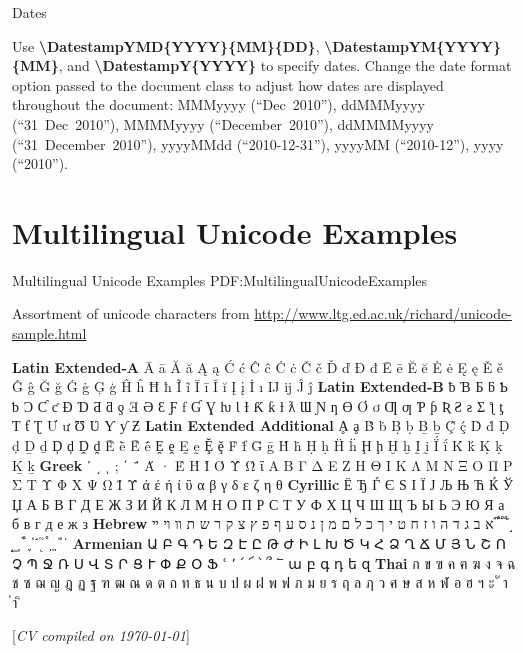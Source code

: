 \documentclass[letterpaper,MMMyyyy,nonstop]{simpleresumecv}
\newcommand{\CVNote}{CV compiled on {\today}}
\newcommand{\CodeCommand}[1]{\mbox{\textbf{\textbackslash{#1}}}}
\begin{document}
\begin{body}
\Gap
\BulletItem
Dates
\begin{detail}
\SubBulletItem
Use
\CodeCommand{DatestampYMD\{YYYY\}\{MM\}\{DD\}},
\CodeCommand{DatestampYM\{YYYY\}\{MM\}}, and
\CodeCommand{DatestampY\{YYYY\}}
to specify dates.
\SubBulletItem
Change the date format option passed to the document class to adjust how dates are displayed throughout the document:
MMMyyyy (``Dec~2010''),
ddMMMyyyy (``31~Dec~2010''),
MMMMyyyy (``December~2010''),
ddMMMMyyyy (``31~December~2010''),
yyyyMMdd (``2010-12-31''),
yyyyMM (``2010-12''),
yyyy (``2010'').
\end{detail}


\section
{Multilingual Unicode Examples}
{Multilingual Unicode Examples}
{PDF:MultilingualUnicodeExamples}

\BulletItem
Assortment of unicode characters from
\href{http://www.ltg.ed.ac.uk/~richard/unicode-sample.html}
{http://www.ltg.ed.ac.uk/{\TildeSymbol}richard/unicode-sample.html}

\begin{detail}
\SubItem
\textbf{Latin Extended-A}
Ā ā Ă ă Ą ą Ć ć Ĉ ĉ Ċ ċ Č č Ď ď Đ đ Ē ē Ĕ ĕ Ė ė Ę ę Ě ě Ĝ ĝ Ğ ğ Ġ ġ Ģ ģ Ĥ ĥ Ħ ħ Ĩ ĩ Ī ī Ĭ ĭ Į į İ ı Ĳ ĳ Ĵ ĵ
\textbf{Latin Extended-B}
ƀ Ɓ Ƃ ƃ Ƅ ƅ Ɔ Ƈ ƈ Ɖ Ɗ Ƌ ƌ ƍ Ǝ Ə Ɛ Ƒ ƒ Ɠ Ɣ ƕ Ɩ Ɨ Ƙ ƙ ƚ ƛ Ɯ Ɲ ƞ Ɵ Ơ ơ Ƣ ƣ Ƥ ƥ Ʀ Ƨ ƨ Ʃ ƪ ƫ Ƭ ƭ Ʈ Ư ư Ʊ Ʋ Ƴ ƴ Ƶ
\textbf{Latin Extended Additional}
Ḁ ḁ Ḃ ḃ Ḅ ḅ Ḇ ḇ Ḉ ḉ Ḋ ḋ Ḍ ḍ Ḏ ḏ Ḑ ḑ Ḓ ḓ Ḕ ḕ Ḗ ḗ Ḙ ḙ Ḛ ḛ Ḝ ḝ Ḟ ḟ Ḡ ḡ Ḣ ḣ Ḥ ḥ Ḧ ḧ Ḩ ḩ Ḫ ḫ Ḭ ḭ Ḯ ḯ Ḱ ḱ Ḳ ḳ Ḵ ḵ
\textbf{Greek}
ʹ ͵ ͺ ; ΄ ΅ Ά · Έ Ή Ί Ό Ύ Ώ ΐ Α Β Γ Δ Ε Ζ Η Θ Ι Κ Λ Μ Ν Ξ Ο Π Ρ Σ Τ Υ Φ Χ Ψ Ω Ϊ Ϋ ά έ ή ί ΰ α β γ δ ε ζ η θ
\textbf{Cyrillic}
Ё Ђ Ѓ Є Ѕ І Ї Ј Љ Њ Ћ Ќ Ў Џ А Б В Г Д Е Ж З И Й К Л М Н О П Р С Т У Ф Х Ц Ч Ш Щ Ъ Ы Ь Э Ю Я а б в г д е ж з
\textbf{Hebrew}
א ב ג ד ה ו ז ח ט י ך כ ל ם מ ן נ ס ע ף פ ץ צ ק ר ש ת װ ױ ײ ֝ ֞ ֟ ֠ ֡ ֣ ֤ ֥ ֦ ֧ ֨ ֩ ֪ ֫ ֬ ֭ ֮ ֯ ְ ֱ ֒ ֓ ֔
\textbf{Armenian}
{\UseSecondaryFont
Ա Բ Գ Դ Ե Զ Է Ը Թ Ժ Ի Լ Խ Ծ Կ Հ Ձ Ղ Ճ Մ Յ Ն Շ Ո Չ Պ Ջ Ռ Ս Վ Տ Ր Ց Ւ Փ Ք Օ Ֆ ՙ ՚ ՛ ՜ ՝ ՞ ՟ ա բ գ դ ե զ}
\textbf{Thai}
{\UseSecondaryFont
ก ข ฃ ค ฅ ฆ ง จ ฉ ช ซ ฌ ญ ฎ ฏ ฐ ฑ ฒ ณ ด ต ถ ท ธ น บ ป ผ ฝ พ ฟ ภ ม ย ร ฤ ล ฦ ว ศ ษ ส ห ฬ อ ฮ ฯ ะ ั า ำ ิ}
\end{detail}

\end{body}


\UseNoteFont%
\null\hfill%
[\textit{\CVNote}]%
\hspace{2.0mm}\null
\end{document}
